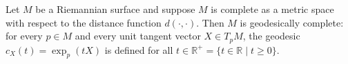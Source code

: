 Let $M$ be a Riemannian surface and suppose $M$ is complete as a metric space with respect to the distance function $d(\cdot,\cdot)$. Then $M$ is geodesically complete: for every $p \in M$ and every unit tangent vector $X \in T_pM$, the geodesic $c_X(t) = \exp_p(tX)$ is defined for all $t \in \mathbb{R}^+ = \{t \in \mathbb{R} \mid t \geq 0\}$.
